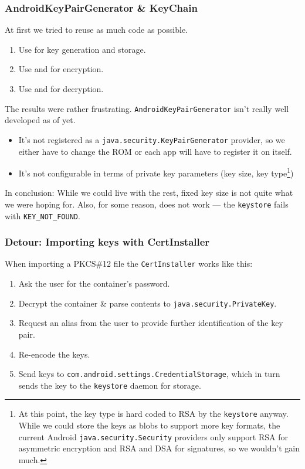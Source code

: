 \documentclass[a4paper,draft]{scrartcl}
\begin{document}
		\subsubsection{AndroidKeyPairGenerator \& KeyChain}
			At first we tried to reuse as much code as possible.
			\begin{enumerate}
				\item Use  for key generation and storage.
				\item Use  and  for encryption.
				\item Use  and  for decryption.
			\end{enumerate}
			The results were rather frustrating. \texttt{AndroidKeyPairGenerator} isn't really well developed as of yet.
			\begin{itemize}
				\item It's not registered as a \texttt{java.security.KeyPairGenerator} provider, so we either have to change the ROM or each app will have to register it on itself.
				\item It's not configurable in terms of private key parameters (key size, key type\footnote{At this point, the key type is hard coded to RSA by the \texttt{keystore} anyway. While we could store the keys as blobs to support more key formats, the current Android \texttt{java.security.Security} providers only support RSA for asymmetric encryption and RSA and DSA for signatures, so we wouldn't gain much.})
			\end{itemize}
			In conclusion: While we could live with the rest, fixed key size is not quite what we were hoping for. Also, for some reason,  does not work --- the \texttt{keystore} fails with \texttt{KEY\_NOT\_FOUND}.

		\subsubsection*{Detour: Importing keys with CertInstaller}
			When importing a PKCS\#12 file the \texttt{CertInstaller} works like this:%
			\begin{enumerate}
				\item Ask the user for the container's password.
				\item Decrypt the container \& parse contents to \texttt{java.security.PrivateKey}.
				\item Request an alias from the user to provide further identification of the key pair.
				\item Re-encode the keys.
				\item Send keys to \texttt{com.android.settings.CredentialStorage}, which in turn sends the key to the \texttt{keystore} daemon for storage.
			\end{enumerate}
\end{document}
